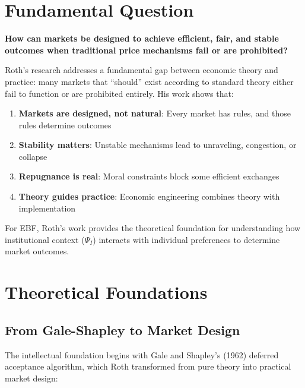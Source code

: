 \section{Fundamental Question}

\begin{tcolorbox}[colback=red!5!white,colframe=red!75!black,title=Central Question]
\textbf{How can markets be designed to achieve efficient, fair, and stable outcomes when traditional price mechanisms fail or are prohibited?}
\end{tcolorbox}

Roth's research addresses a fundamental gap between economic theory and practice: many markets that ``should'' exist according to standard theory either fail to function or are prohibited entirely. His work shows that:

\begin{enumerate}
    \item \textbf{Markets are designed, not natural}: Every market has rules, and those rules determine outcomes
    \item \textbf{Stability matters}: Unstable mechanisms lead to unraveling, congestion, or collapse
    \item \textbf{Repugnance is real}: Moral constraints block some efficient exchanges
    \item \textbf{Theory guides practice}: Economic engineering combines theory with implementation
\end{enumerate}

For EBF, Roth's work provides the theoretical foundation for understanding how institutional context ($\Psi_I$) interacts with individual preferences to determine market outcomes.

\section{Theoretical Foundations}

\subsection{From Gale-Shapley to Market Design}

The intellectual foundation begins with Gale and Shapley's (1962) deferred acceptance algorithm, which Roth transformed from pure theory into practical market design:

